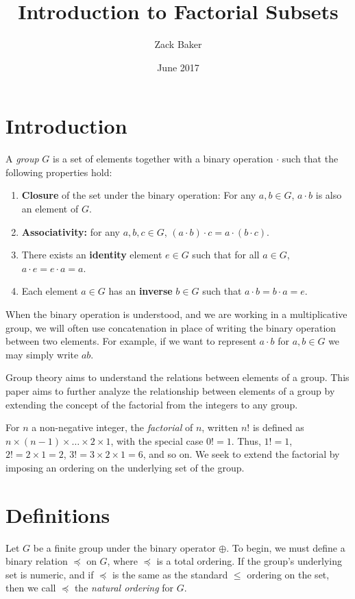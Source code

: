 \documentclass{article}
\title{Introduction to Factorial Subsets}
\author{Zack Baker }
\date{June 2017}
\begin{document}
\maketitle

\section{Introduction}

A \textit{group} $G$ is a set of elements together with a binary operation $\cdot$ such that the following properties hold:
\begin{enumerate}
\item \textbf{Closure} of the set under the binary operation: For any $a,b\in G$, $a\cdot b$ is also an element of $G$.
\item \textbf{Associativity:} for any $a,b,c\in G$, $(a\cdot b)\cdot c = a\cdot(b\cdot c)$.
\item There exists an \textbf{identity} element $e \in G$ such that for all $a\in G$, $a\cdot e = e\cdot a = a$.
\item Each element $a\in G$ has an \textbf{inverse} $b\in G$ such that $a\cdot b=b\cdot a = e$.
\end{enumerate}

When the binary operation is understood, and we are working in a multiplicative group, we will often use concatenation in place of writing the binary operation between two elements. For example, if we want to represent $a\cdot b$ for $a,b\in G$ we may simply write $ab$.

Group theory aims to understand the relations between elements of a group. This paper aims to further analyze the relationship between elements of a group by extending the concept of the factorial from the integers to any group.

For $n$ a non-negative integer, the \textit{factorial} of $n$, written $n!$ is defined as $n\times (n-1) \times \ldots \times 2 \times 1$, with the special case $0!=1$. Thus, $1! = 1$, $2!=2\times 1 = 2$, $3! = 3\times 2 \times 1 = 6$, and so on. We seek to extend the factorial by imposing an ordering on the underlying set of the group.




\section{Definitions}
Let $G$ be a finite group under the binary operator $\oplus$. To begin, we must define a binary relation $\preceq$ on $G$, where $\preceq$ is a total ordering. If the group's underlying set is numeric, and if $\preceq$ is the same as the standard $\leq$ ordering on the set, then we call $\preceq$ the \textit{natural ordering} for $G$. 
\end{document}
